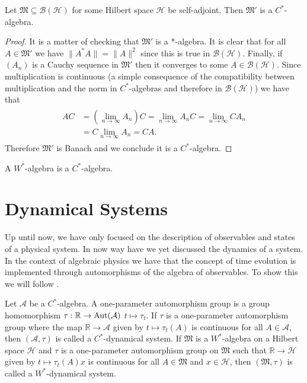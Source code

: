 \begin{theorem}
Let $\mathfrak{M}\subseteq \mathcal{B}({\mathcal{H}})$ for some Hilbert space $\mathcal{H}$ be self-adjoint. Then $\mathfrak{M}'$ is a $C^*$-algebra.
\end{theorem}

\begin{proof}
It is a matter of checking that $\mathfrak{M}'$ is a *-algebra. It is clear that for all $A\in\mathfrak{M}'$ we have $\|A^*A\|=\|A\|^2$ since this is true in $\mathcal{B}(\mathcal{H})$. Finally, if $(A_n)$ is a Cauchy sequence in $\mathfrak{M}'$ then it converges to some $A\in\mathcal{B}(\mathcal{H})$. Since multiplication is continuous (a simple consequence of the compatibility between multiplication and the norm in $C^*$-algebras and therefore in $\mathcal{B}(\mathcal{H})$) we have that
\begin{align}
\begin{split}
AC&=(\lim_{n\rightarrow\infty}A_n)C = \lim_{n\rightarrow\infty}A_nC=\lim_{n\rightarrow\infty}CA_n \\
&= C\lim_{n\rightarrow\infty}A_n=CA.
\end{split}
\end{align}
Therefore $\mathfrak{M}'$ is Banach and we conclude it is a $C^*$-algebra.
\end{proof}

\begin{corollary}\label{cor:W_C}
A $W^*$-algebra is a $C^*$-algebra.
\end{corollary}

\section{Dynamical Systems}

Up until now, we have only focused on the description of observables and states of a physical system. In now way have we yet discussed the dynamics of a system. In the context of algebraic physics we have that the concept of time evolution is implemented through automorphisms of the algebra of observables. To show this we will follow \cite{Duvenhage1999}.

\begin{definition}\label{def:dynamics}
Let $\mathcal{A}$ be a $C^*$-algebra. A one-parameter automorphism group is a group homomorphism $\tau:\mathbb{R}\rightarrow \operatorname{Aut}(\mathcal{A})$ $t\mapsto\tau_t$. If $\tau$ is a one-parameter automorphism group where the map $\mathbb{R}\rightarrow\mathcal{A}$ given by $t\mapsto\tau_t(A)$ is continuous for all $A\in\mathcal{A}$, then $(\mathcal{A},\tau)$ is called a $C^*$-dynamical system. If $\mathfrak{M}$ is a $W^*$-algebra on a Hilbert space $\mathcal{H}$ and $\tau$ is a one-parameter automorphism group on $\mathfrak{M}$ such that $\mathbb{R}\rightarrow\mathcal{H}$ given by $t\mapsto\tau_t(A)x$ is continuous for all $A\in\mathfrak{M}$ and $x\in\mathcal{H}$, then $(\mathfrak{M},\tau)$ is called a $W^*$-dynamical system. 
\end{definition}

